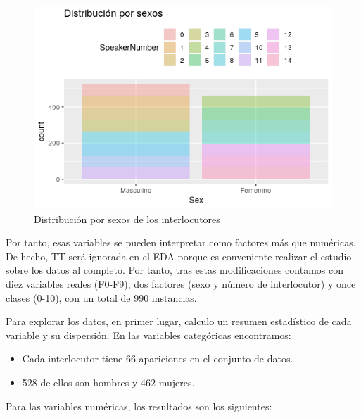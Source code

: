 \begin{figure}[H] %
	\centering
	\includegraphics[scale=0.7]{dist-sexos.png}  %
	\caption{Distribución por sexos de los interlocutores} 
	\label{fig:dist-sex}
\end{figure}

Por tanto, esas variables se pueden interpretar como factores más que numéricas. De hecho, TT será ignorada en el EDA porque es conveniente realizar el estudio sobre los datos al completo. Por tanto, tras estas modificaciones contamos con diez variables reales (F0-F9), dos factores (sexo y número de interlocutor) y once clases (0-10), con un total de 990 instancias. 

Para explorar los datos, en primer lugar, calculo un resumen estadístico de cada variable y su dispersión. En las variables categóricas encontramos:

\begin{itemize}
	\item Cada interlocutor tiene 66 apariciones en el conjunto de datos.
	\item 528 de ellos son hombres y 462 mujeres.
\end{itemize}

Para las variables numéricas, los resultados son los siguientes:

